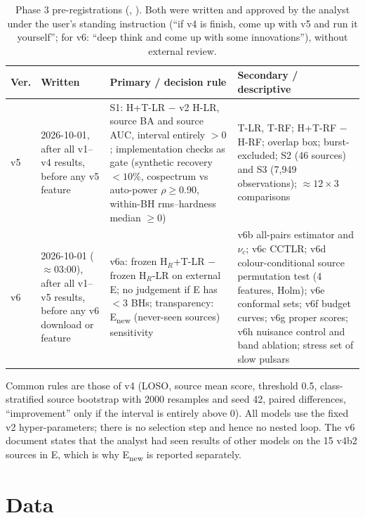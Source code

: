\begin{table}[htbp]
\centering\small
\caption[Phase 3 pre-registrations]{Phase 3 pre-registrations (,
). Both were written and approved by the analyst under the user's standing
instruction (``if v4 is finish, come up with v5 and run it yourself''; for v6: ``deep think and come up with some
innovations''), without external review.}
\label{tab:p3prereg}
\begin{tabularx}{\textwidth}{@{}p{0.8cm}p{2.9cm}XX@{}}
\toprule
Ver. & Written & Primary / decision rule & Secondary / descriptive \\
\midrule
v5 & 2026-10-01, after all v1--v4 results, before any v5 feature & \Primary{} S1: H+T-LR $-$ v2 H-LR, source BA and source AUC, interval entirely $>0$; implementation checks as gate (synthetic recovery $<10\%$, cospectrum vs auto-power $\rho\ge0.90$, within-BH rms--hardness median $\ge0$) & T-LR, T-RF; H+T-RF $-$ H-RF; overlap box; burst-excluded; S2 (46 sources) and S3 (7,949 observations); $\approx12\times3$ comparisons \\
v6 & 2026-10-01 ($\approx$03:00), after all v1--v5 results, before any v6 download or feature & \Primary{} v6a: frozen H$_R$+T-LR $-$ frozen H$_R$-LR on external E; no judgement if E has $<3$ BHs; transparency: E\textsubscript{new} (never-seen sources) sensitivity & v6b all-pairs estimator and $\nu_c$; v6c CCTLR; v6d colour-conditional source permutation test (4 features, Holm); v6e conformal sets; v6f budget curves; v6g proper scores; v6h nuisance control and band ablation; stress set of slow pulsars \\
\bottomrule
\end{tabularx}
\end{table}

Common rules are those of v4 (LOSO, source mean score, threshold 0.5, class-stratified source bootstrap with 2000
resamples and seed 42, paired differences, ``improvement'' only if the interval is entirely above 0). All models use the
fixed v2 hyper-parameters; there is no selection step and hence no nested loop. The v6 document states that the analyst
had seen results of other models on the 15 v4b2 sources in E, which is why E\textsubscript{new} is reported separately.

\section{Data}
